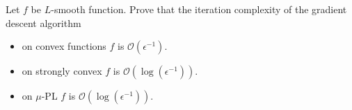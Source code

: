 \documentclass{ExerciseSheet}
\newif\ifsolutions
\begin{document}
\begin{problem}[Corollary 4.1]
    Let $f$ be $L$-smooth function. Prove that the iteration complexity of the gradient descent algorithm 
    \begin{itemize}
        \item on convex functions $f$ is $\mathcal{O}(\epsilon^{-1})$.
        \item on strongly convex $f$ is $\mathcal{O}(\log(\epsilon^{-1})).$
        \item on $\mu$-PL $f$ is $\mathcal{O}(\log(\epsilon^{-1})).$
    \end{itemize}
\end{problem}

\ifsolutions
\vskip 0.3cm
\end{document}

